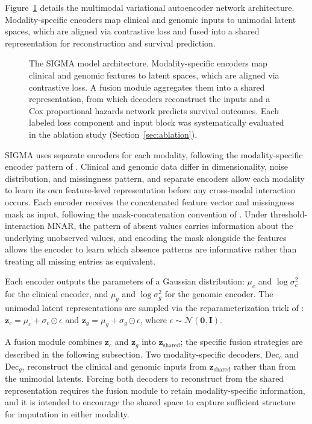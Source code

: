 \documentclass[final,3p,times,authoryear]{elsarticle}
\begin{document}
Figure~\ref{fig:architecture} details the multimodal variational autoencoder network architecture. Modality-specific encoders map clinical and genomic inputs to unimodal latent spaces, which are aligned via contrastive loss and fused into a shared representation for reconstruction and survival prediction.
\begin{figure}[!t]
\centering

\caption{The SIGMA model architecture. Modality-specific encoders map clinical and genomic features to latent spaces, which are aligned via contrastive loss. A fusion module aggregates them into a shared representation, from which decoders reconstruct the inputs and a Cox proportional hazards network predicts survival outcomes. Each labeled loss component and input block was systematically evaluated in the ablation study (Section~\ref{sec:ablation}).}
\label{fig:architecture}
\end{figure}
SIGMA uses separate encoders for each modality, following the modality-specific encoder pattern of \citet{chang2025myevae}. Clinical and genomic data differ in dimensionality, noise distribution, and missingness pattern, and separate encoders allow each modality to learn its own feature-level representation before any cross-modal interaction occurs. Each encoder receives the concatenated feature vector and missingness mask as input, following the mask-concatenation convention of \citet{mnarsvae}. Under threshold-interaction MNAR, the pattern of absent values carries information about the underlying unobserved values, and encoding the mask alongside the features allows the encoder to learn which absence patterns are informative rather than treating all missing entries as equivalent.

Each encoder outputs the parameters of a Gaussian distribution: $\mu_c$ and $\log \sigma_c^2$ for the clinical encoder, and $\mu_g$ and $\log \sigma_g^2$ for the genomic encoder. The unimodal latent representations are sampled via the reparameterization trick of \citet{kingma2014auto}: $\mathbf{z}_c = \mu_c + \sigma_c \odot \epsilon$ and $\mathbf{z}_g = \mu_g + \sigma_g \odot \epsilon$, where $\epsilon \sim \mathcal{N}(\mathbf{0}, \mathbf{I})$.

A fusion module combines $\mathbf{z}_c$ and $\mathbf{z}_g$ into $\mathbf{z}_{\text{shared}}$; the specific fusion strategies are described in the following subsection. Two modality-specific decoders, $\text{Dec}_c$ and $\text{Dec}_g$, reconstruct the clinical and genomic inputs from $\mathbf{z}_{\text{shared}}$ rather than from the unimodal latents. Forcing both decoders to reconstruct from the shared representation requires the fusion module to retain modality-specific information, and it is intended to encourage the shared space to capture sufficient structure for imputation in either modality.
\end{document}
